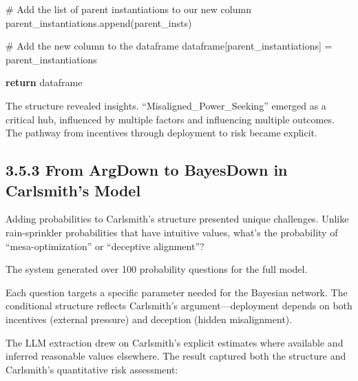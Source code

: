 \documentclass[
  11pt,
  letterpaper,
  openany]{book}
\newenvironment{Shaded}{\begin{snugshade}}{\end{snugshade}}
\newcommand{\CommentTok}[1]{\textcolor[rgb]{0.37,0.37,0.37}{#1}}
\newcommand{\ControlFlowTok}[1]{\textcolor[rgb]{0.00,0.23,0.31}{\textbf{#1}}}
\newcommand{\NormalTok}[1]{\textcolor[rgb]{0.00,0.23,0.31}{#1}}
\newcommand{\OperatorTok}[1]{\textcolor[rgb]{0.37,0.37,0.37}{#1}}
\newcommand{\StringTok}[1]{\textcolor[rgb]{0.13,0.47,0.30}{#1}}
\begin{document}
\begin{landscape}
\begin{Shaded}
\begin{Highlighting}[]
        \CommentTok{\# Add the list of parent instantiations to our new column}
\NormalTok{        parent\_instantiations.append(parent\_insts)}

    \CommentTok{\# Add the new column to the dataframe}
\NormalTok{    dataframe[}\StringTok{\textquotesingle{}parent\_instantiations\textquotesingle{}}\NormalTok{] }\OperatorTok{=}\NormalTok{ parent\_instantiations}

    \ControlFlowTok{return}\NormalTok{ dataframe}
\end{Highlighting}
\end{Shaded}

The structure revealed insights. ``Misaligned\_Power\_Seeking'' emerged
as a critical hub, influenced by multiple factors and influencing
multiple outcomes. The pathway from incentives through deployment to
risk became explicit.

\subsection{3.5.3 From ArgDown to BayesDown in Carlsmith's
Model}\label{sec-carlsmith-bayesdown}

Adding probabilities to Carlsmith's structure presented unique
challenges. Unlike rain-sprinkler probabilities that have intuitive
values, what's the probability of ``mesa-optimization'' or ``deceptive
alignment''?

The system generated over 100 probability questions for the full model.

Each question targets a specific parameter needed for the Bayesian
network. The conditional structure reflects Carlsmith's
argument---deployment depends on both incentives (external pressure) and
deception (hidden misalignment).

The LLM extraction drew on Carlsmith's explicit estimates where
available and inferred reasonable values elsewhere. The result captured
both the structure and Carlsmith's quantitative risk assessment:


\end{landscape}
\end{document}
